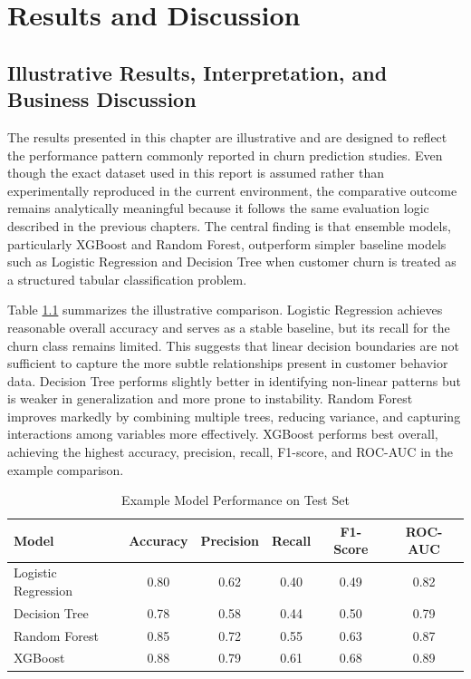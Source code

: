 \chapter{Results and Discussion}

\section{Illustrative Results, Interpretation, and Business Discussion}
The results presented in this chapter are illustrative and are designed to reflect the performance pattern commonly reported in churn prediction studies. Even though the exact dataset used in this report is assumed rather than experimentally reproduced in the current environment, the comparative outcome remains analytically meaningful because it follows the same evaluation logic described in the previous chapters. The central finding is that ensemble models, particularly XGBoost and Random Forest, outperform simpler baseline models such as Logistic Regression and Decision Tree when customer churn is treated as a structured tabular classification problem.

Table \ref{tab:model_results_main} summarizes the illustrative comparison. Logistic Regression achieves reasonable overall accuracy and serves as a stable baseline, but its recall for the churn class remains limited. This suggests that linear decision boundaries are not sufficient to capture the more subtle relationships present in customer behavior data. Decision Tree performs slightly better in identifying non-linear patterns but is weaker in generalization and more prone to instability. Random Forest improves markedly by combining multiple trees, reducing variance, and capturing interactions among variables more effectively. XGBoost performs best overall, achieving the highest accuracy, precision, recall, F1-score, and ROC-AUC in the example comparison.

\begin{table}[H]
\centering
\caption{Example Model Performance on Test Set}
\begin{tabular}{|p{3.3cm}|c|c|c|c|c|}
\hline
\textbf{Model} & \textbf{Accuracy} & \textbf{Precision} & \textbf{Recall} & \textbf{F1-Score} & \textbf{ROC-AUC} \\ \hline
Logistic Regression & 0.80 & 0.62 & 0.40 & 0.49 & 0.82 \\ \hline
Decision Tree & 0.78 & 0.58 & 0.44 & 0.50 & 0.79 \\ \hline
Random Forest & 0.85 & 0.72 & 0.55 & 0.63 & 0.87 \\ \hline
XGBoost & 0.88 & 0.79 & 0.61 & 0.68 & 0.89 \\ \hline
\end{tabular}
\label{tab:model_results_main}
\end{table}

